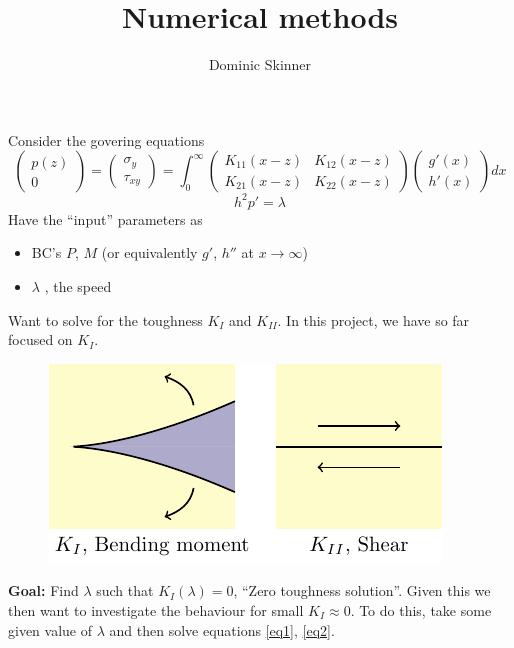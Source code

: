 \documentclass{article}
\begin{document}
\title{Numerical methods}
\author{Dominic Skinner}
\maketitle

Consider the govering equations
\begin{equation}\label{eq1}
\left( \begin{array}{c} p(z) \\ 0 \end{array} \right) =
 \left( \begin{array}{c} \sigma_y \\ \tau_{xy} \end{array} \right) =
\int_0^{\infty} \left(
\begin{array}{cc} K_{11}(x-z) & K_{12}(x-z) \\ K_{21}(x-z) & K_{22}(x-z) 
\end{array} \right)
 \left( \begin{array}{c} g'(x) \\ h'(x) \end{array} \right) dx
\end{equation}
%
\begin{equation}\label{eq2}
h^2p'=\lambda
\end{equation}
Have the ``input'' parameters as 
\begin{itemize}
\item BC's $P$, $M$ (or equivalently $g'$, $h''$ at $x\to\infty$)
\item $\lambda$ , the speed
\end{itemize}
Want to solve for the toughness $K_I$ and $K_{II}$. In this project,
we have so far focused on $K_I$.
\begin{figure}[!ht]\centering
\includegraphics{NumFig3.pdf}
\end{figure}

\textbf{Goal:} 
Find $\lambda$ such that $K_I(\lambda)=0$, ``Zero toughness solution''.
Given this we then want to investigate the behaviour for small $K_I\approx 0$.
To do this, take some given value of $\lambda$ and then solve equations
\ref{eq1}, \ref{eq2}.
\end{document}
